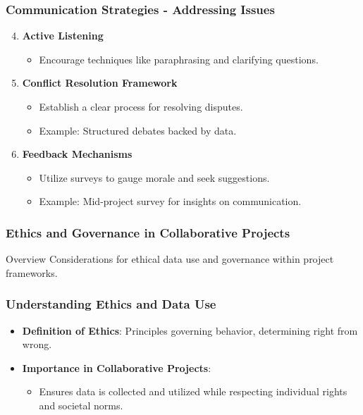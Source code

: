 \documentclass[aspectratio=169]{beamer}
\begin{document}
\begin{frame}[fragile]
    \frametitle{Communication Strategies - Addressing Issues}
    \begin{enumerate}
        \setcounter{enumi}{3} %
        \item \textbf{Active Listening}
            \begin{itemize}
                \item Encourage techniques like paraphrasing and clarifying questions.
            \end{itemize}
        
        \item \textbf{Conflict Resolution Framework}
            \begin{itemize}
                \item Establish a clear process for resolving disputes.
                \item Example: Structured debates backed by data.
            \end{itemize}

        \item \textbf{Feedback Mechanisms}
            \begin{itemize}
                \item Utilize surveys to gauge morale and seek suggestions.
                \item Example: Mid-project survey for insights on communication.
            \end{itemize}
    \end{enumerate}
\end{frame}

\begin{frame}[fragile]
    \frametitle{Ethics and Governance in Collaborative Projects}
    \begin{block}{Overview}
        Considerations for ethical data use and governance within project frameworks.
    \end{block}
\end{frame}

\begin{frame}[fragile]
    \frametitle{Understanding Ethics and Data Use}
    \begin{itemize}
        \item \textbf{Definition of Ethics}: Principles governing behavior, determining right from wrong.
        \item \textbf{Importance in Collaborative Projects}:
        \begin{itemize}
            \item Ensures data is collected and utilized while respecting individual rights and societal norms.
        \end{itemize}
    \end{itemize}
\end{frame}
\end{document}
